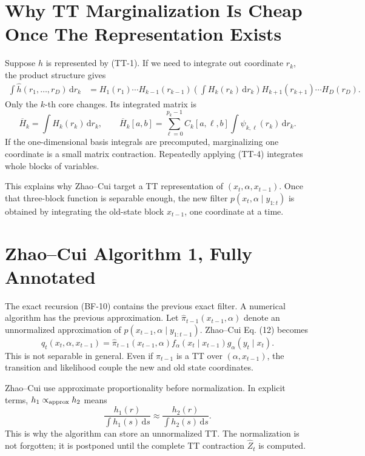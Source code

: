 \documentclass[11pt]{article}
\newcommand{\dd}{\,\mathrm d}
\begin{document}
\section{Why TT Marginalization Is Cheap Once The Representation Exists}

Suppose \(h\) is represented by (TT-1).  If we need to integrate out coordinate
\(r_k\), the product structure gives
\[
\begin{aligned}
 \int \widehat h(r_1,\ldots,r_D)\dd r_k
 &=
 H_1(r_1)\cdots H_{k-1}(r_{k-1})
 \left(\int H_k(r_k)\dd r_k\right)
 H_{k+1}(r_{k+1})\cdots H_D(r_D).
\end{aligned}
\tag{TT-4}
\]
Only the \(k\)-th core changes.  Its integrated matrix is
\[
    \overline H_k
    =
    \int H_k(r_k)\dd r_k,\qquad
    \overline H_k[a,b]
    =
    \sum_{\ell=0}^{p_k-1} C_k[a,\ell,b]
    \int \psi_{k,\ell}(r_k)\dd r_k.
    \tag{TT-5}
\]
If the one-dimensional basis integrals are precomputed, marginalizing one
coordinate is a small matrix contraction.  Repeatedly applying (TT-4) integrates
whole blocks of variables.

This explains why Zhao--Cui target a TT representation of
\((x_t,\alpha,x_{t-1})\).  Once that three-block function is separable enough,
the new filter \(p(x_t,\alpha\mid y_{1:t})\) is obtained by integrating the
old-state block \(x_{t-1}\), one coordinate at a time.

\section{Zhao--Cui Algorithm 1, Fully Annotated}

The exact recursion (BF-10) contains the previous exact filter.  A numerical
algorithm has the previous approximation.  Let
\(\widehat\pi_{t-1}(x_{t-1},\alpha)\) denote an unnormalized approximation of
\(p(x_{t-1},\alpha\mid y_{1:t-1})\).  Zhao--Cui Eq. (12) becomes
\[
    q_t(x_t,\alpha,x_{t-1})
    =
    \widehat\pi_{t-1}(x_{t-1},\alpha)
    f_\alpha(x_t\mid x_{t-1})
    g_\alpha(y_t\mid x_t).
    \tag{A1-1}
\]
This is not separable in general.  Even if
\(\widehat\pi_{t-1}\) is a TT over \((\alpha,x_{t-1})\), the transition and
likelihood couple the new and old state coordinates.

Zhao--Cui use approximate proportionality before normalization.  In explicit
terms, \(h_1\propto_{\rm approx} h_2\) means
\[
    \frac{h_1(r)}{\int h_1(s)\dd s}
    \approx
    \frac{h_2(r)}{\int h_2(s)\dd s}.
    \tag{A1-0}
\]
This is why the algorithm can store an unnormalized TT.  The normalization is
not forgotten; it is postponed until the complete TT contraction
\(\widehat Z_t\) is computed.
\end{document}
